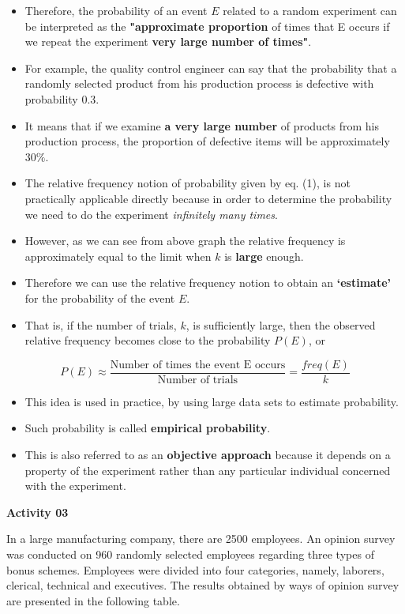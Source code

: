 \documentclass[]{book}
\providecommand{\tightlist}{%
  \setlength{\itemsep}{0pt}\setlength{\parskip}{0pt}}
\begin{document}
\begin{itemize}
\tightlist
\item
  Therefore, the probability of an event \(E\) related to a random experiment can be interpreted as the \textbf{"approximate proportion} of times that E occurs if we repeat the experiment \textbf{very large number of times"}.
\item
  For example, the quality control engineer can say that the probability that a randomly selected product from his production process is defective with probability 0.3.
\item
  It means that if we examine \textbf{a very large number} of products from his production process, the proportion of defective items will be approximately \(30\%\).
\item
  The relative frequency notion of probability given by eq. (1), is not practically applicable directly because in order to determine the probability we need to do the experiment \emph{inﬁnitely many times}.
\item
  However, as we can see from above graph the relative frequency is approximately equal to the limit when \(k\) is \textbf{large} enough.
\item
  Therefore we can use the relative frequency notion to obtain an \textbf{`estimate'} for the probability of the event \(E\).
\item
  That is, if the number of trials, \(k\), is sufficiently large, then the observed relative frequency becomes close to the probability \(P(E)\), or
\end{itemize}

\[P(E) \approx \frac{\text{Number of times the event E occurs}}{\text{Number of trials}}= \frac{freq(E)}{k}\]

\begin{itemize}
\tightlist
\item
  This idea is used in practice, by using large data sets to estimate probability.
\item
  Such probability is called \textbf{empirical probability}.
\item
  This is also referred to as an \textbf{objective approach} because it depends on a property of the experiment rather than any particular individual concerned with the experiment.
\end{itemize}

\textbf{Activity 03}

In a large manufacturing company, there are 2500 employees. An opinion survey was conducted on 960 randomly selected employees regarding three types of bonus schemes. Employees were divided into four categories, namely, laborers, clerical, technical and executives. The results obtained by ways of opinion survey are presented in the following table.
\end{document}
